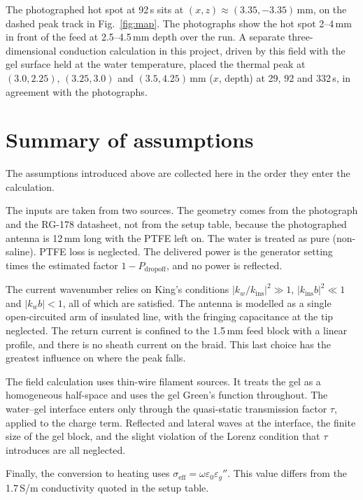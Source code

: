\documentclass[11pt,a4paper]{article}
\newcommand{\eps}{\varepsilon}
\begin{document}
The photographed hot spot at 92\,s sits at $(x,z)\approx(3.35,-3.35)$\,mm, on the dashed peak track in
Fig.~\ref{fig:map}. The photographs show the hot spot 2--4\,mm in front of the feed at 2.5--4.5\,mm depth
over the run. A separate three-dimensional conduction calculation in this project, driven by this field
with the gel surface held at the water temperature, placed the thermal peak at
$(3.0, 2.25)$, $(3.25, 3.0)$ and $(3.5, 4.25)$\,mm ($x$, depth) at 29, 92 and 332\,s, in agreement with the
photographs.

\section{Summary of assumptions}\label{sec:assumptions}

The assumptions introduced above are collected here in the order they enter the calculation.

The inputs are taken from two sources. The geometry comes from the photograph and the RG-178 datasheet, not
from the setup table, because the photographed antenna is 12\,mm long with the PTFE left on. The water is
treated as pure (non-saline). PTFE loss is neglected. The delivered power is the generator setting times
the estimated factor $1-P_{\text{dropoff}}$, and no power is reflected.

The current wavenumber relies on King's conditions $|k_w/k_{\text{ins}}|^2\gg1$, $|k_{\text{ins}}b|^2\ll1$ and
$|k_wb|<1$, all of which are satisfied. The antenna is modelled as a single open-circuited arm of insulated
line, with the fringing capacitance at the tip neglected. The return current is confined to the 1.5\,mm feed
block with a linear profile, and there is no sheath current on the braid. This last choice has the greatest
influence on where the peak falls.

The field calculation uses thin-wire filament sources. It treats the gel as a homogeneous half-space and
uses the gel Green's function throughout. The water--gel interface enters only through the quasi-static
transmission factor $\tau$, applied to the charge term. Reflected and lateral waves at the interface, the
finite size of the gel block, and the slight violation of the Lorenz condition that $\tau$ introduces are
all neglected.

Finally, the conversion to heating uses $\sigma_{\text{eff}}=\omega\eps_0\eps_g''$. This value differs from
the 1.7\,S/m conductivity quoted in the setup table.
\end{document}
